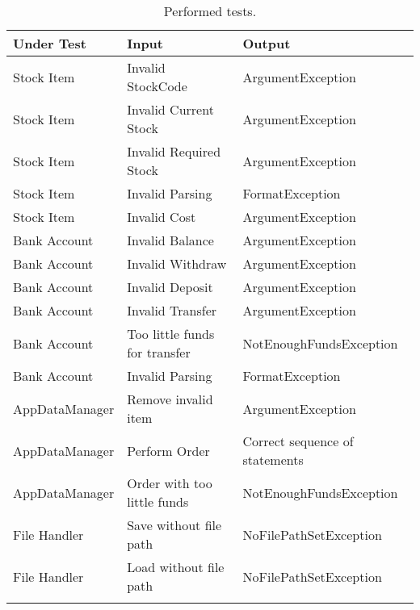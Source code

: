 \begin{longtable}{X X X}
\hline Under Test & Input & Output \\ 
\hline
\hline Stock Item & Invalid StockCode & ArgumentException \\ 
\hline Stock Item & Invalid Current Stock & ArgumentException \\ 
\hline Stock Item & Invalid Required Stock & ArgumentException \\ 
\hline Stock Item & Invalid Parsing & FormatException \\ 
\hline Stock Item & Invalid Cost & ArgumentException \\ 
\hline Bank Account & Invalid Balance & ArgumentException \\ 
\hline Bank Account & Invalid Withdraw & ArgumentException \\ 
\hline Bank Account & Invalid Deposit & ArgumentException \\ 
\hline Bank Account & Invalid Transfer & ArgumentException \\
\hline Bank Account & Too little funds for transfer & NotEnoughFundsException \\
\hline Bank Account & Invalid Parsing & FormatException \\
\hline AppDataManager & Remove invalid item & ArgumentException \\
\hline AppDataManager & Perform Order & Correct sequence of statements \\
\hline AppDataManager & Order with too little funds & NotEnoughFundsException \\
\hline File Handler & Save without file path & NoFilePathSetException \\
\hline File Handler & Load without file path & NoFilePathSetException \\
\caption{Performed tests.}
\end{longtable} 
